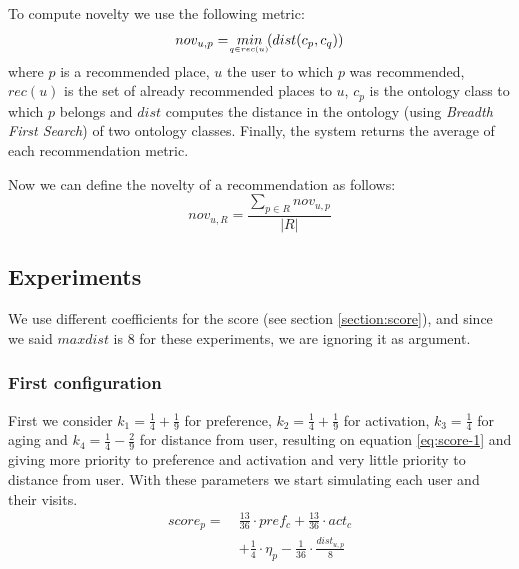 To compute novelty \cite{kotkov2016survey} we use the following metric:
\begin{equation} \label{eq:novelty}
    nov_{u, p} = \  \underaccent{q \in rec(u)}{min} \  ( dist( c_p, c_q ) )
\end{equation}
where $p$ is a recommended place, $u$ the user to which $p$ was recommended, $rec(u)$ is the set of already recommended places to $u$, $c_p$ is the ontology class to which $p$ belongs and $dist$ computes the distance in the ontology (using \textit{Breadth First Search}) of two ontology classes. Finally, the system returns the average of each recommendation metric.

Now we can define the novelty of a recommendation as follows:
\begin{equation}
    nov_{u, R} = \frac{ \displaystyle \sum_{p \in R}{nov_{u, p}} }{| R |}
\end{equation}

\subsection{Experiments}
We use different coefficients for the score (see section \ref{section:score}), and since we said $maxdist$ is $8$ for these experiments, we are ignoring it as argument. 

\subsubsection{First configuration}
First we consider $k_1 = \frac{1}{4} + \frac{1}{9}$ for preference, $k_2 = \frac{1}{4} + \frac{1}{9}$ for activation, $k_3 = \frac{1}{4}$ for aging and $k_4 = \frac{1}{4} - \frac{2}{9}$ for distance from user, resulting on equation \ref{eq:score-1} and giving more priority to preference and activation and very little priority to distance from user. With these parameters we start simulating each user and their visits.
\begin{equation} \label{eq:score-1}
    \begin{split}
        score_p = \ &\frac{13}{36} \cdot pref_c + \frac{13}{36} \cdot act_c \\
                                        &+ \frac{1}{4} \cdot \eta_p - \frac{1}{36} \cdot \frac{dist_{u,p}}{8}
    \end{split}
\end{equation}

